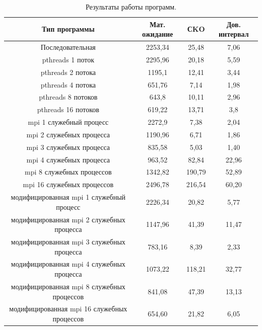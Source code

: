 \documentclass[12pt,a4paper]{report}
\begin{document}
				\begin{table}[h]
					\caption{\label{tab:totalTab} Результаты работы программ.}
					\begin{center}
						\begin{tabular}{|c|c|c|c|}
							\hline
							\textbf{Тип программы} & \textbf{Мат. ожидание} & \textbf{СKO} & \textbf{Дов. интервал}\\
							\hline
							Последовательная & 2253,34 & 25,48 & 7,06\\
							\hline
							pthreads 1 поток & 2295,96 & 20,18 & 5,59\\
							\hline
							pthreads 2 потока & 1195,1 & 12,41 & 3,44\\
							\hline
							pthreads 4 потока & 651,76 & 7,14 & 1,98\\
							\hline
							pthreads 8 потоков & 643,8 & 10,11 & 2,96\\
							\hline
							pthreads 16 потоков & 619,22 & 13,71 & 3,8\\
							\hline
							mpi 1 служебный процесс & 2272,9 & 7,38 & 2,04\\
							\hline
							mpi 2 служебных процесса & 1190,96 & 6,71 & 1,86\\
							\hline
							mpi 3 служебных процесса & 835,58 & 5,03 & 1,40\\
							\hline
							mpi 4 служебных процесса & 963,52 & 82,84 & 22,96\\
							\hline
							mpi 8 служебных процессов & 1342,82 & 190,79 & 52,89\\
							\hline
							mpi 16 служебных процессов & 2496,78 & 216,54 & 60,20\\
							\hline
							модифицированная mpi 1 служебный процесс & 2226,34 & 20,82 & 5,77 
							\\
							\hline
							модифицированная mpi 2 служебных процесса & 1147,96 & 41,39 &  
							11,47\\
							\hline
							модифицированная mpi 3 служебных процесса & 783,16 & 8,39 & 2,33\\
							\hline
							модифицированная mpi 4 служебных процесса & 1073,22 & 118,21 & 
							32,77\\
							\hline
							модифицированная mpi 8 служебных процессов & 841,08 & 47,39 & 
							13,13\\
							\hline
							модифицированная mpi 16 служебных процессов & 654,60 & 21,82 & 
							6,05\\
							\hline
						\end{tabular}
					\end{center}
				\end{table}
				
\end{document}
